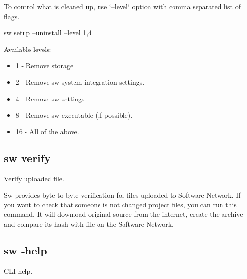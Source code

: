 To control what is cleaned up, use `--level` option with comma separated list of flags.

\begin{command}
sw setup --uninstall --level 1,4
\end{command}

Available levels:
\begin{itemize}
\item 1 - Remove storage.
\item 2 - Remove sw system integration settings.
\item 4 - Remove sw settings.
\item 8 - Remove sw executable (if possible).
\item 16 - All of the above.
\end{itemize}

\subsection{sw verify}

Verify uploaded file.

Sw provides byte to byte verification for files uploaded to Software Network.
If you want to check that someone is not changed project files, you can run this command.
It will download original source from the internet, create the archive and compare its hash with file on the Software Network.


\subsection{sw -help}

CLI help.

